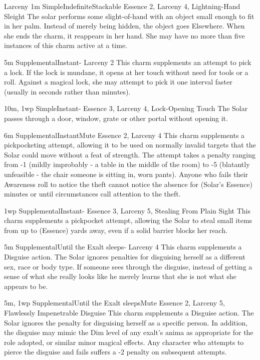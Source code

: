 \begin{Ability}{Larceny}
  {1m}
  {Simple}{Indefinite}{Stackable}
  {Essence 2, Larceny 4, Lightning-Hand Sleight}
  The solar performs some slight-of-hand with an object small enough to fit in her palm. Instead of merely being hidden, the object goes Elsewhere. When she ends the charm, it reappears in her hand. She may have no more than five instances of this charm active at a time.

  {5m}
  {Supplemental}{Instant}{-}
  {Larceny 2}
  This charm supplements an attempt to pick a lock. If the lock is mundane, it opens at her touch without need for tools or a roll. Against a magical lock, she may attempt to pick it one interval faster (usually in seconds rather than minutes).

  {10m, 1wp}
  {Simple}{Instant}{-}
  {Essence 3, Larceny 4, Lock-Opening Touch}
  The Solar passes through a door, window, grate or other portal without opening it.

  {6m}
  {Supplemental}{Instant}{Mute}
  {Essence 2, Larceny 4}
  This charm supplements a pickpocketing attempt, allowing it to be used on normally invalid targets that the Solar could move without a feat of strength. The attempt takes a penalty ranging from -1 (mildly improbably - a table in the middle of the room) to -5 (blatantly unfeasible - the chair someone is sitting in, worn pants). Anyone who fails their Awareness roll to notice the theft cannot notice the absence for (Solar's Essence) minutes or until circumstances call attention to the theft.

  {1wp}
  {Supplemental}{Instant}{-}
  {Essence 3, Larceny 5, Stealing From Plain Sight}
  This charm supplements a pickpocket attempt, allowing the Solar to steal small items from up to (Essence) yards away, even if a solid barrier blocks her reach.

  {5m}
  {Supplemental}{Until the Exalt sleeps}{-}
  {Larceny 4}
  This charm supplements a Disguise action. The Solar ignores penalties for disguising herself as a different sex, race or body type. If someone sees through the disguise, instead of getting a sense of what she really looks like he merely learns that she is not what she appears to be.

  {5m, 1wp}
  {Supplemental}{Until the Exalt sleeps}{Mute}
  {Essence 2, Larceny 5, Flawlessly Impenetrable Disguise}
  This charm supplements a Disguise action. The Solar ignores the penalty for disguising herself as a specific person. In addition, the disguise may mimic the Dim level of any exalt's anima as appropriate for the role adopted, or similar minor magical effects. Any character who attempts to pierce the disguise and fails suffers a -2 penalty on subsequent attempts.


\end{Ability}
